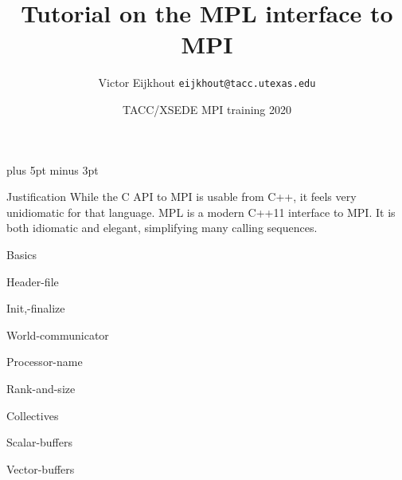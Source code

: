 \documentclass[11pt,headernav]{beamer}
\newcounter{tacc}
\def\Location{}%
\def\courseyear{2020}
\def\Location{TACC APP institute MPI training \courseyear}
\def\Location{TACC/XSEDE MPI training \courseyear}
\begin{document}
\parskip=10pt plus 5pt minus 3pt

\title{Tutorial on the MPL interface to MPI}
\author{Victor Eijkhout {\tt eijkhout@tacc.utexas.edu}}
\date{\Location}

\begin{frame}
  \titlepage
\end{frame}

\begin{xsede}
  
\end{xsede}

\begin{frame}{Justification}
  While the C API to MPI is usable from C++, it feels very unidiomatic
  for that language.
  MPL is a modern C++11 interface to MPI.
  It is both idiomatic and elegant, simplifying many calling sequences.
\end{frame}

 {Basics}

\begin{frame}[containsverbatim]{Header-file}
  
\end{frame}
\begin{frame}[containsverbatim]{Init,-finalize}
  
\end{frame}
\begin{frame}[containsverbatim]{World-communicator}
  
\end{frame}
\begin{frame}[containsverbatim]{Processor-name}
  
\end{frame}
\begin{frame}[containsverbatim]{Rank-and-size}
  
\end{frame}

 {Collectives}

\begin{frame}[containsverbatim]{Scalar-buffers}
  
\end{frame}
\begin{frame}[containsverbatim]{Vector-buffers}
  
\end{frame}
\end{document}
